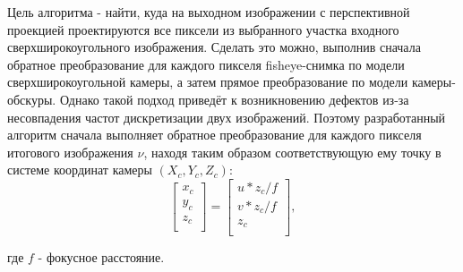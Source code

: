 Цель алгоритма - найти, куда на выходном изображении  с  перспективной проекцией проектируются все пиксели из 
выбранного участка входного сверхширокоугольного изображения. Сделать это можно, выполнив сначала обратное 
преобразование для каждого пикселя fisheye-снимка по модели сверхширокоугольной камеры, а затем прямое преобразование 
по модели камеры-обскуры. Однако такой подход приведёт к возникновению дефектов из-за несовпадения %
частот дискретизации двух изображений.  Поэтому разработанный алгоритм сначала выполняет обратное преобразование  для 
каждого пикселя итогового изображения $\nu$, находя таким образом соответствующую ему точку в системе координат 
камеры $({X_c, Y_c, Z_c})$:
\vskip 12pt
\begin{equation}
    \label{eq:uv_to_xyz}
    \left[\begin{matrix}x_c\\y_c\\z_c\\\end{matrix}\right] = \left[\begin{matrix} {u*z_c}/f \\  {v*z_c}/f \\ z_c \\\end{matrix}\right],
\end{equation} 
\vskip 24pt

где  $f$ - фокусное расстояние. 

